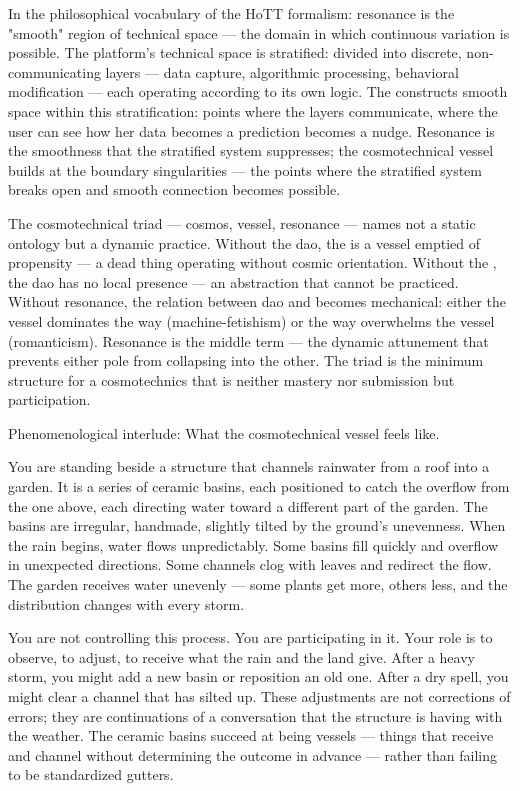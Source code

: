 In the philosophical vocabulary of the HoTT formalism: resonance is the "smooth" region of technical space — the domain in which continuous variation is possible. The platform's technical space is stratified: divided into discrete, non-communicating layers — data capture, algorithmic processing, behavioral modification — each operating according to its own logic. The  constructs smooth space within this stratification: points where the layers communicate, where the user can see how her data becomes a prediction becomes a nudge. Resonance is the smoothness that the stratified system suppresses; the cosmotechnical vessel builds at the boundary singularities — the points where the stratified system breaks open and smooth connection becomes possible.

The cosmotechnical triad — cosmos, vessel, resonance — names not a static ontology but a dynamic practice. Without the dao, the  is a vessel emptied of propensity — a dead thing operating without cosmic orientation. Without the , the dao has no local presence — an abstraction that cannot be practiced. Without resonance, the relation between dao and  becomes mechanical: either the vessel dominates the way (machine-fetishism) or the way overwhelms the vessel (romanticism). Resonance is the middle term — the dynamic attunement that prevents either pole from collapsing into the other. The triad is the minimum structure for a cosmotechnics that is neither mastery nor submission but participation.

Phenomenological interlude: What the cosmotechnical vessel feels like.

You are standing beside a structure that channels rainwater from a roof into a garden. It is a series of ceramic basins, each positioned to catch the overflow from the one above, each directing water toward a different part of the garden. The basins are irregular, handmade, slightly tilted by the ground's unevenness. When the rain begins, water flows unpredictably. Some basins fill quickly and overflow in unexpected directions. Some channels clog with leaves and redirect the flow. The garden receives water unevenly — some plants get more, others less, and the distribution changes with every storm.

You are not controlling this process. You are participating in it. Your role is to observe, to adjust, to receive what the rain and the land give. After a heavy storm, you might add a new basin or reposition an old one. After a dry spell, you might clear a channel that has silted up. These adjustments are not corrections of errors; they are continuations of a conversation that the structure is having with the weather. The ceramic basins succeed at being vessels — things that receive and channel without determining the outcome in advance — rather than failing to be standardized gutters.

